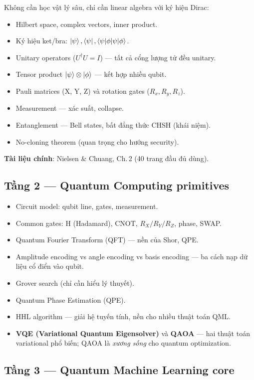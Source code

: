 \documentclass[11pt,a4paper]{article}
\begin{document}
Không cần học vật lý sâu, chỉ cần linear algebra với ký hiệu Dirac:
\begin{itemize}
  \item Hilbert space, complex vectors, inner product.
  \item Ký hiệu ket/bra: $\ket{\psi}, \bra{\psi}, \braket{\psi|\phi}$.
  \item Unitary operators ($U^\dagger U = I$) --- tất cả cổng lượng tử đều unitary.
  \item Tensor product $\ket{\psi} \otimes \ket{\phi}$ --- kết hợp nhiều qubit.
  \item Pauli matrices (X, Y, Z) và rotation gates ($R_x, R_y, R_z$).
  \item Measurement --- xác suất, collapse.
  \item Entanglement --- Bell states, bất đẳng thức CHSH (khái niệm).
  \item No-cloning theorem (quan trọng cho hướng security).
\end{itemize}
\textbf{Tài liệu chính}: Nielsen \& Chuang, Ch.\,2 (40 trang đầu đủ dùng).

\subsection{Tầng 2 --- Quantum Computing primitives}
\begin{itemize}
  \item Circuit model: qubit line, gates, measurement.
  \item Common gates: H (Hadamard), CNOT, $R_X/R_Y/R_Z$, phase, SWAP.
  \item Quantum Fourier Transform (QFT) --- nền của Shor, QPE.
  \item Amplitude encoding vs angle encoding vs basis encoding --- ba cách nạp dữ liệu cổ điển vào qubit.
  \item Grover search (chỉ cần hiểu lý thuyết).
  \item Quantum Phase Estimation (QPE).
  \item HHL algorithm --- giải hệ tuyến tính, nền cho nhiều thuật toán QML.
  \item \textbf{VQE (Variational Quantum Eigensolver)} và \textbf{QAOA} --- hai thuật toán variational phổ biến; QAOA là \textit{xương sống} cho quantum optimization.
\end{itemize}

\subsection{Tầng 3 --- Quantum Machine Learning core}
\end{document}
